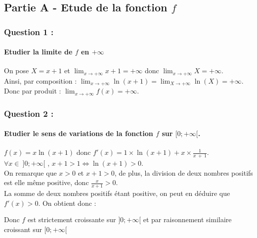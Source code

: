 \documentclass[a4paper, 12pt]{article}
\begin{document}
{}
\subsection*{Partie A - Etude de la fonction $f$}

{}
\subsubsection*{Question 1 :}
\paragraph*{Etudier la limite de $f$ en $+\infty$\\[5mm]}

On pose $X = x + 1$ et $\displaystyle \lim_{x \to +\infty}x+1=+\infty$ donc $\displaystyle \lim_{x \to +\infty} X = +\infty$.
\\[3mm]
Ainsi, par composition : $\displaystyle \lim_{x \to +\infty}\ln{\left(x+1\right)} = \displaystyle \lim_{X \to +\infty} \ln{\left(X\right)} = +\infty$.
\\[3mm]
Donc par produit : $\displaystyle \lim_{x \to +\infty} f(x) = +\infty$.

{}
\subsubsection*{Question 2 :}
\paragraph*{Etudier le sens de variations de la fonction $f$ sur $[0;+\infty[$. \\[5mm]}

$f(x) = x\ln{\left(x + 1 \right)}$ donc $f'(x) = 1 \times \ln{\left(x + 1 \right)} + x \times \frac{1}{x\ +\ 1}$.
\\[2mm]
$\forall x \in \ ]0;+\infty[$ , $x+1 > 1 \iff \ln{\left(x + 1 \right)} > 0$.
\\[2mm]
On remarque que $x > 0$ et $x + 1 >0$, de plus, la division de deux nombres positifs est elle même positive, donc $\frac{x}{x+1} > 0$.
\\[2mm]
La somme de deux nombres positifs étant positive, on peut en déduire que $f'(x)> 0$. On obtient donc :
\begin{center}
\end{center}
Donc $f$ est strictement croissante sur $ ]0;+\infty[$ et par raisonnement similaire croissant sur $[0;+\infty[$
\end{document}
